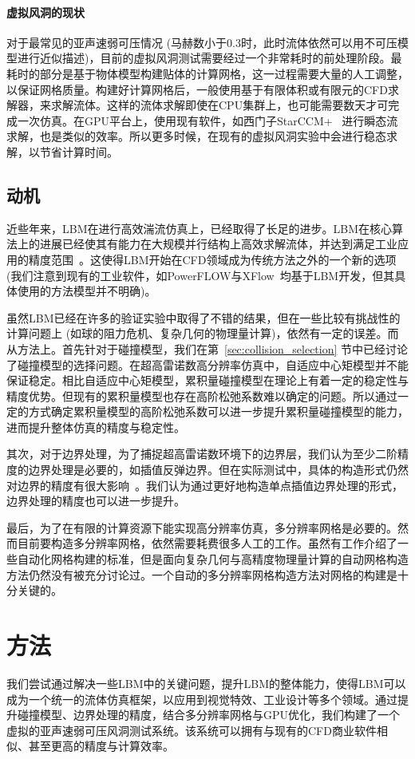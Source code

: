 \paragraph{虚拟风洞的现状}
对于最常见的亚声速弱可压情况 (马赫数小于0.3时，此时流体依然可以用不可压模型进行近似描述)，目前的虚拟风洞测试需要经过一个非常耗时的前处理阶段。最耗时的部分是基于物体模型构建贴体的计算网格，这一过程需要大量的人工调整，以保证网格质量。构建好计算网格后，一般使用基于有限体积或有限元的CFD求解器，来求解流体。这样的流体求解即使在CPU集群上，也可能需要数天才可完成一次仿真。在GPU平台上，使用现有软件，如西门子StarCCM+~\citep{Siemens} 进行瞬态流求解，也是类似的效率。所以更多时候，在现有的虚拟风洞实验中会进行稳态求解，以节省计算时间。

\subsection{动机}
近些年来，LBM在进行高效湍流仿真上，已经取得了长足的进步。LBM在核心算法上的进展已经使其有能力在大规模并行结构上高效求解流体，并达到满足工业应用的精度范围~\citep{Lallemand:2021}。这使得LBM开始在CFD领域成为传统方法之外的一个新的选项 (我们注意到现有的工业软件，如PowerFLOW与XFlow~\citep{Simulia}均基于LBM开发，但其具体使用的方法模型并不明确)。

虽然LBM已经在许多的验证实验中取得了不错的结果，但在一些比较有挑战性的计算问题上 (如球的阻力危机、复杂几何的物理量计算)，依然有一定的误差。而从方法上。首先针对于碰撞模型，我们在第~\ref{sec:collision_selection} 节中已经讨论了碰撞模型的选择问题。在超高雷诺数高分辨率仿真中，自适应中心矩模型并不能保证稳定。相比自适应中心矩模型，累积量碰撞模型在理论上有着一定的稳定性与精度优势。但现有的累积量模型也存在高阶松弛系数难以确定的问题。所以通过一定的方式确定累积量模型的高阶松弛系数可以进一步提升累积量碰撞模型的能力，进而提升整体仿真的精度与稳定性。

其次，对于边界处理，为了捕捉超高雷诺数环境下的边界层，我们认为至少二阶精度的边界处理是必要的，如插值反弹边界。但在实际测试中，具体的构造形式仍然对边界的精度有很大影响~\citep{Chen-2021-b}。我们认为通过更好地构造单点插值边界处理的形式，边界处理的精度也可以进一步提升。

最后，为了在有限的计算资源下能实现高分辨率仿真，多分辨率网格是必要的。然而目前要构造多分辨率网格，依然需要耗费很多人工的工作。虽然有工作介绍了一些自动化网格构建的标准，但是面向复杂几何与高精度物理量计算的自动网格构造方法仍然没有被充分讨论过。一个自动的多分辨率网格构造方法对网格的构建是十分关键的。

\section{方法}
我们尝试通过解决一些LBM中的关键问题，提升LBM的整体能力，使得LBM可以成为一个统一的流体仿真框架，以应用到视觉特效、工业设计等多个领域。通过提升碰撞模型、边界处理的精度，结合多分辨率网格与GPU优化，我们构建了一个虚拟的亚声速弱可压风洞测试系统。该系统可以拥有与现有的CFD商业软件相似、甚至更高的精度与计算效率。

